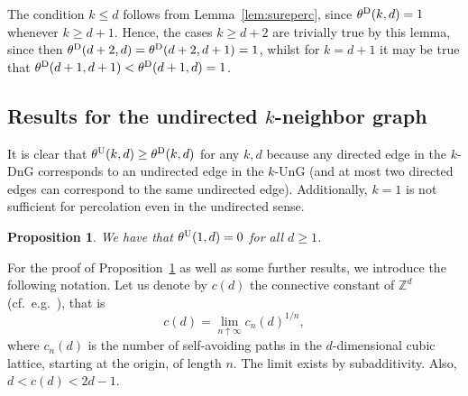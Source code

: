 \documentclass[oneside]{amsart}
\newtheorem{prop}[theorem]{Proposition}
\newtheorem{conj}[theorem]{Conjecture}
\theoremstyle{definition}
\newcommand{\1}{\mathbbm{1}}
\newcommand{\0}{\mathbf{o}}
\newcommand{\Z}{\mathbb{Z}}
\newcommand{\basc}[1]{{\color{blue}{ \bf [~Bas:\ }\emph{#1}\textbf{~]}}}
\numberwithin{equation}{section}
\begin{document}
The condition $k\leq d$ follows from Lemma~\ref{lem:sureperc}, since $\theta^{\rm D}(k,d)=1$ whenever $k\geq d+1$. Hence, the cases $k\geq d+2$ are trivially true by this lemma, since then $\theta^{\rm D}(d+2,d)=\theta^{\rm D}(d+2,d+1)=1$, whilst for $k=d+1$ it may be true that $\theta^{\rm D}(d+1,d+1)<\theta^{\rm D}(d+1,d)=1$.



\subsection{Results for the undirected $k$-neighbor graph}\label{sec:U}

\medskip

It is clear that $\theta^{\rm U}(k,d) \geq \theta^{\rm D}(k,d)$ for any $k,d$ because any directed edge in the $k$-DnG corresponds to an undirected edge in the $k$-UnG (and at most two directed edges can correspond to the same undirected edge). Additionally, $k=1$ is not sufficient for percolation even in the undirected sense.  

\begin{prop}\label{prop-U1}
    We have that $\theta^{\rm U}(1,d)=0$ for all $d \geq 1$.
\end{prop}

For the proof of Proposition~\ref{prop-U1} as well as some further results, we introduce the following notation. Let us denote by $c(d)$ the connective constant of $\Z^d$ (cf.~e.g.\ \cite{Grimmett1999}), that is $$c(d)=\lim_{n\uparrow\infty}c_n(d)^{1/n},$$
where $c_n(d)$ is the number of self-avoiding paths in the $d$-dimensional cubic lattice, starting at the origin, of length $n$. The limit exists by subadditivity. Also, $d<c(d)<2d-1$. 
\end{document}
